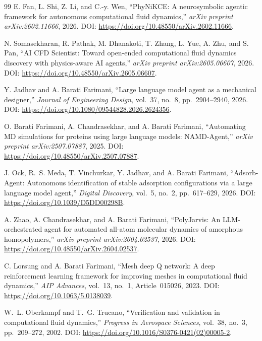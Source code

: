 \documentclass[11pt]{article}
\begin{document}
\begin{thebibliography}{99}
E. Fan, L. Shi, Z. Li, and C.-y. Wen,
``PhyNiKCE: A neurosymbolic agentic framework for
autonomous computational fluid dynamics,''
\textit{arXiv preprint arXiv:2602.11666}, 2026.
DOI: \url{https://doi.org/10.48550/arXiv.2602.11666}.

N. Somasekharan, R. Pathak, M. Dhanakoti,
T. Zhang, L. Yue, A. Zhu, and S. Pan,
``AI CFD Scientist: Toward open-ended computational fluid
dynamics discovery with physics-aware AI agents,''
\textit{arXiv preprint arXiv:2605.06607}, 2026.
DOI: \url{https://doi.org/10.48550/arXiv.2605.06607}.

Y. Jadhav and A. Barati Farimani,
``Large language model agent as a mechanical designer,''
\textit{Journal of Engineering Design}, vol.~37, no.~8, pp.~2904--2940, 2026.
DOI: \url{https://doi.org/10.1080/09544828.2026.2624356}.

O. Barati Farimani, A. Chandrasekhar, and A. Barati Farimani,
``Automating {MD} simulations for proteins using large language models:
{NAMD-Agent},''
\textit{arXiv preprint arXiv:2507.07887}, 2025.
DOI: \url{https://doi.org/10.48550/arXiv.2507.07887}.

J. Ock, R.~S. Meda, T. Vinchurkar, Y. Jadhav, and A. Barati Farimani,
``Adsorb-Agent: Autonomous identification of stable adsorption
configurations via a large language model agent,''
\textit{Digital Discovery}, vol.~5, no.~2, pp.~617--629, 2026.
DOI: \url{https://doi.org/10.1039/D5DD00298B}.

A. Zhao, A. Chandrasekhar, and A. Barati Farimani,
``{PolyJarvis}: An {LLM}-orchestrated agent for automated all-atom molecular
dynamics of amorphous homopolymers,''
\textit{arXiv preprint arXiv:2604.02537}, 2026.
DOI: \url{https://doi.org/10.48550/arXiv.2604.02537}.

C. Lorsung and A. Barati Farimani,
``Mesh deep {Q} network: A deep reinforcement learning framework for
improving meshes in computational fluid dynamics,''
\textit{AIP Advances}, vol.~13, no.~1, Article~015026, 2023.
DOI: \url{https://doi.org/10.1063/5.0138039}.

W.~L. Oberkampf and T.~G. Trucano,
``Verification and validation in computational fluid dynamics,''
\textit{Progress in Aerospace Sciences}, vol.~38, no.~3,
pp.~209--272, 2002.
DOI: \url{https://doi.org/10.1016/S0376-0421(02)00005-2}.


\end{thebibliography}
\end{document}
